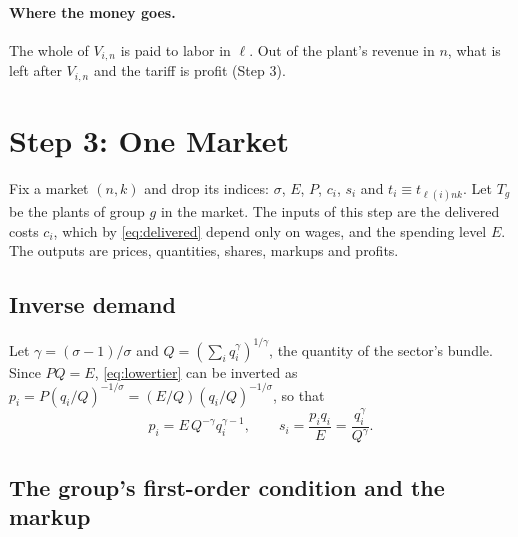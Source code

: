 \documentclass[11pt]{article}
\begin{document}
\paragraph{Where the money goes.} The whole of $V_{i,n}$ is paid to labor in $\ell$.
Out of the plant's revenue in $n$, what is left after $V_{i,n}$ and the tariff is profit
(Step 3).

\section{Step 3: One Market}
\label{sec:market}

Fix a market $(n,k)$ and drop its indices: $\sigma$, $E$, $P$, $c_i$, $s_i$ and
$t_i\equiv t_{\ell(i)nk}$. Let $T_g$ be the plants of group $g$ in the market. The inputs
of this step are the delivered costs $c_i$, which by \eqref{eq:delivered} depend only on
wages, and the spending level $E$. The outputs are prices, quantities, shares, markups
and profits.

\subsection{Inverse demand}

Let $\gamma=(\sigma-1)/\sigma$ and $Q=(\sum_iq_i^\gamma)^{1/\gamma}$, the quantity of
the sector's bundle. Since $PQ=E$, \eqref{eq:lowertier} can be inverted as
$p_i=P(q_i/Q)^{-1/\sigma}=(E/Q)(q_i/Q)^{-1/\sigma}$, so that
\begin{equation}
  p_i=E\,Q^{-\gamma}q_i^{\gamma-1},
  \qquad
  s_i=\frac{p_iq_i}{E}=\frac{q_i^\gamma}{Q^\gamma} .
  \label{eq:inverse}
\end{equation}

\subsection{The group's first-order condition and the markup}
\end{document}
